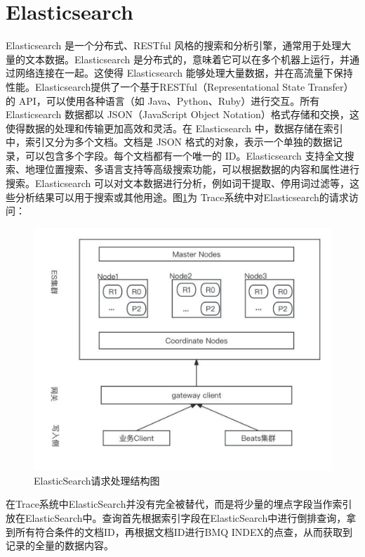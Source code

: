 \section{Elasticsearch}  
Elasticsearch 是一个分布式、RESTful 风格的搜索和分析引擎，通常用于处理大量的文本数据。Elasticsearch 是分布式的，意味着它可以在多个机器上运行，并通过网络连接在一起。这使得 Elasticsearch 能够处理大量数据，并在高流量下保持性能。Elasticsearch提供了一个基于RESTful（Representational State Transfer）的 API，可以使用各种语言（如 Java、Python、Ruby）进行交互。所有 Elasticsearch 数据都以 JSON（JavaScript Object Notation）格式存储和交换，这使得数据的处理和传输更加高效和灵活。在 Elasticsearch 中，数据存储在索引中，索引又分为多个文档。文档是 JSON 格式的对象，表示一个单独的数据记录，可以包含多个字段。每个文档都有一个唯一的 ID。Elasticsearch 支持全文搜索、地理位置搜索、多语言支持等高级搜索功能，可以根据数据的内容和属性进行搜索。Elasticsearch 可以对文本数据进行分析，例如词干提取、停用词过滤等，这些分析结果可以用于搜索或其他用途。图\ref{ElasticSearch}为
Trace系统中对Elasticsearch的请求访问：
\begin{figure}[htb]
  \centering
  \includegraphics[width=5in]{figure/chapter2/ElasticSearch请求处理结构图.pdf}
  \caption{ElasticSearch请求处理结构图}\label{ElasticSearch}
\end{figure}

在Trace系统中ElasticSearch并没有完全被替代，而是将少量的埋点字段当作索引放在ElasticSearch中。查询首先根据索引字段在ElasticSearch中进行倒排查询，拿到所有符合条件的文档ID，再根据文档ID进行BMQ INDEX的点查，从而获取到记录的全量的数据内容。

